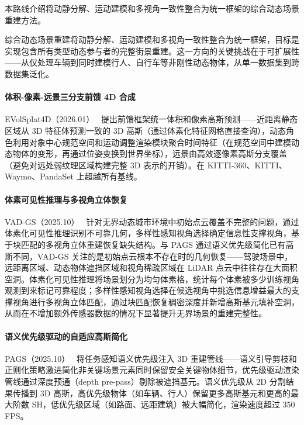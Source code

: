 本路线介绍将动静分解、运动建模和多视角一致性整合为统一框架的综合动态场景重建方法。

综合动态场景重建将动静分解、运动建模和多视角一致性整合为统一框架，目标是实现包含所有类型动态参与者的完整街景重建。这一方向的关键挑战在于可扩展性——从仅处理车辆到同时建模行人、自行车等非刚性动态物体，从单一数据集到跨数据集泛化。

\paragraph{体积-像素-远景三分支前馈 4D 合成}

EVolSplat4D（2026.01）~\cite{2601_15951} 提出前馈框架统一体积和像素高斯预测——近距离静态区域从 3D 特征体预测一致的 3D 高斯（通过体素化特征网格直接查询），动态角色利用对象中心规范空间和运动调整渲染模块聚合时间特征（在规范空间中建模动态物体的变形，再通过位姿变换到世界坐标），远景由高效逐像素高斯分支覆盖（避免对远处弱纹理区域构建完整 3D 表示的开销）。在 KITTI-360、KITTI、Waymo、PandaSet 上超越所有基线。

\paragraph{体素可见性推理与多视角立体恢复}

VAD-GS（2025.10）~\cite{2510_09364} 针对无界动态城市环境中初始点云覆盖不完整的问题，通过体素化可见性推理识别不可靠几何，多样性感知视角选择确定信息性支撑视角，基于块匹配的多视角立体重建恢复缺失结构。与 PAGS 通过语义优先级简化已有高斯不同，VAD-GS 关注的是初始点云根本不存在时的几何恢复——驾驶场景中，远距离区域、动态物体遮挡区域和视角稀疏区域在 LiDAR 点云中往往存在大面积空洞。体素化可见性推理将场景划分为均匀体素格，统计每个体素被多少训练视角观测到来标记可靠程度；多样性感知视角选择在候选视角中挑选信息增益最大的支撑视角进行多视角立体匹配，通过块匹配恢复稠密深度并新增高斯基元填补空洞，从而在不增加额外传感器数据的情况下显著提升无界场景的重建完整性。

\paragraph{语义优先级驱动的自适应高斯简化}

PAGS（2025.10）~\cite{2510_12282} 将任务感知语义优先级注入 3D 重建管线——语义引导剪枝和正则化策略激进简化非关键场景元素同时保留安全关键物体细节，优先级驱动渲染管线通过深度预通（depth pre-pass）剔除被遮挡基元。语义优先级从 2D 分割结果传播到 3D 高斯，高优先级物体（如车辆、行人）保留更多高斯基元和更高的最大阶数 SH，低优先级区域（如路面、远距建筑）被大幅简化，渲染速度超过 350 FPS。

